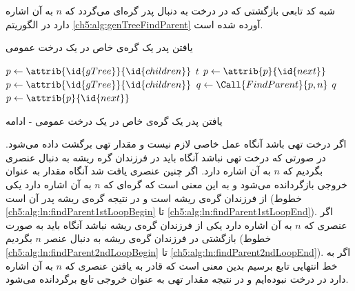 
شبه کد تابعی بازگشتی که در درخت {} به دنبال پدر گره‌‌‌ای می‌گردد که {$n$} به آن اشاره دارد در الگوریتم {\eqref{ch5:alg:genTreeFindParent}} آورده شده است.

\begin{algorithm}[H]
\caption{یافتن پدر یک گره‌ی خاص در یک درخت عمومی}\label{ch5:alg:genTreeFindParent}
\begin{latin}
\begin{algorithmic}[1]
				\State	\Return {}
		\EndIf
		\State	$p \gets \attrib{\id{gTree}}{\id{children}}$\label{ch5:alg:ln:findParent1stLoopBegin}
						\State	\Return $t$
				\EndIf
				\State	$p \gets \attrib{p}{\id{next}}$
		\EndWhile\label{ch5:alg:ln:findParent1stLoopEnd}
		\State	$p \gets \attrib{\id{gTree}}{\id{children}}$\label{ch5:alg:ln:findParent2ndLoopBegin}		
				\State	$q \gets \Call{FindParent}{p,n}$
						\State	\Return $q$
				\EndIf
				\State	$p \gets \attrib{p}{\id{next}}$
\end{algorithmic}
\end{latin}
\end{algorithm}

\begin{algorithm}[H]
\caption*{یافتن پدر یک گره‌ی خاص در یک درخت عمومی - ادامه}
\begin{latin}
\begin{algorithmic}[1]
		\EndWhile\label{ch5:alg:ln:findParent2ndLoopEnd}
		\State	\Return {}
\EndFunction
\end{algorithmic}
\end{latin}
\end{algorithm}

اگر درخت {} تهی باشد آنگاه عمل خاصی لازم نیست و مقدار تهی برگشت داده می‌شود. در صورتی که درخت {} تهی نباشد آنگاه باید در فرزندان گره ریشه به دنبال عنصری بگردیم که {$n$} به آن اشاره دارد. اگر چنین عنصری یافت شد آنگاه مقدار {} به عنوان خروجی بازگردانده می‌شود و به این معنی است که گره‌ای که {$n$} به آن اشاره دارد یکی از فرزندان گره‌ی ریشه است و در نتیجه گره‌ی ریشه پدر آن است (خطوط {\ref{ch5:alg:ln:findParent1stLoopBegin}} تا {\ref{ch5:alg:ln:findParent1stLoopEnd}}). اگر عنصری که {$n$} به آن اشاره دارد یکی از فرزندان گره‌ی ریشه نباشد آنگاه باید به صورت بازگشتی در فرزندان گره‌ی ریشه به دنبال عنصر {$n$} بگردیم (خطوط {\ref{ch5:alg:ln:findParent2ndLoopBegin}} تا {\ref{ch5:alg:ln:findParent2ndLoopEnd}}). اگر به خط انتهایی تابع برسیم بدین معنی است که قادر به یافتن عنصری که {$n$} به آن اشاره دارد در درخت {} نبوده‌ایم و در نتیجه مقدار تهی به عنوان خروجی تابع برگردانده می‌شود.

